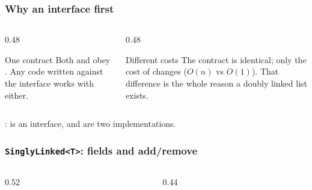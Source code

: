 \documentclass[aspectratio=169,10pt,compress]{beamer}
\begin{document}
\begin{frame}[t,fragile] \frametitle{Why an interface first}
  \begin{columns}[T]
    \begin{column}{0.48\textwidth}
      \begin{block}{One contract}
        \small
        Both  and  obey
        .
        Any code written against the interface works with either.
      \end{block}
    \end{column}
    \begin{column}{0.48\textwidth}
      \begin{block}{Different costs}
        \small
        The contract is identical; only the cost of
         changes ($O(n)$ vs $O(1)$).
        That difference is the whole reason a doubly linked list exists.
      \end{block}
    \end{column}
  \end{columns}
  \vspace{0.4em}
  \small
  :  is an interface,
   and  are two implementations.
\end{frame}





\begin{frame}[t,fragile] \frametitle{\texttt{SinglyLinked<T>}: fields and add/remove}
  \begin{columns}[T]
    \begin{column}{0.52\textwidth}
    \end{column}
    \begin{column}{0.44\textwidth}
    \end{column}
  \end{columns}
\end{frame}
\end{document}
